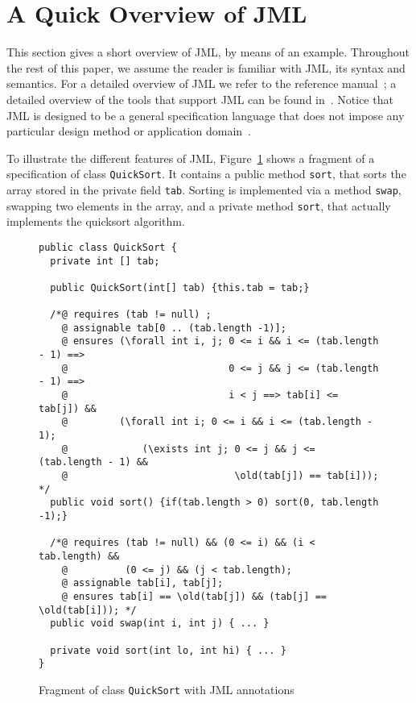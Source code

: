 \section{A Quick Overview of JML}\label{SecJML}



This section gives a short overview of JML, by means of an
example. Throughout the rest of this paper, we assume the reader is
familiar with JML, its syntax and semantics. For a detailed overview
of JML we refer to the reference manual~\cite{LeavensPCCRCK05}; a
detailed overview of the tools that support JML can be found
in~\cite{BurdyCCEKLLP03}.  Notice that JML is designed to be a general
specification language that does not impose any particular design
method or application domain~\cite{LeavensBR06}.



To illustrate the different features of JML, Figure~\ref{FigJMLSpec}
shows a fragment of a specification of class
\texttt{QuickSort}. It contains a public method
\texttt{sort}, that sorts the array stored in the private field
\texttt{tab}. Sorting is implemented via  a method \texttt{swap},
swapping two elements in the array, and a private method
\texttt{sort}, that actually implements the quicksort algorithm.

\begin{figure}[t!]
{\small
\begin{verbatim}
public class QuickSort {
  private int [] tab;

  public QuickSort(int[] tab) {this.tab = tab;}

  /*@ requires (tab != null) ;
    @ assignable tab[0 .. (tab.length -1)];
    @ ensures (\forall int i, j; 0 <= i && i <= (tab.length - 1) ==> 
    @                            0 <= j && j <= (tab.length - 1) ==>
    @                            i < j ==> tab[i] <= tab[j]) &&
    @         (\forall int i; 0 <= i && i <= (tab.length - 1); 
    @             (\exists int j; 0 <= j && j <= (tab.length - 1) && 
    @                             \old(tab[j]) == tab[i])); */
  public void sort() {if(tab.length > 0) sort(0, tab.length -1);}

  /*@ requires (tab != null) && (0 <= i) && (i < tab.length) && 
    @          (0 <= j) && (j < tab.length);
    @ assignable tab[i], tab[j];
    @ ensures tab[i] == \old(tab[j]) && (tab[j] == \old(tab[i])); */
  public void swap(int i, int j) { ... }

  private void sort(int lo, int hi) { ... }
}
\end{verbatim}
}
\vspace*{-1em}\caption{Fragment of class \texttt{QuickSort} with JML annotations} 
\label{FigJMLSpec}
\end{figure}



